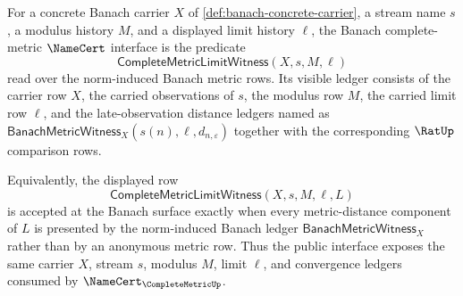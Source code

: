 \begin{definition}
\label{def:banach-complete-metric-namecert-interface}
For a concrete Banach carrier $X$ of
\autoref{def:banach-concrete-carrier}, a stream name $s$, a modulus history
$M$, and a displayed limit history $\ell$, the Banach complete-metric
$\NameCert$ interface is the predicate
$$
\mathsf{CompleteMetricLimitWitness}(X,s,M,\ell)
$$
read over the norm-induced Banach metric rows. Its visible ledger consists of
the carrier row $X$, the carried observations of $s$, the modulus row $M$, the
carried limit row $\ell$, and the late-observation distance ledgers named as
$\mathsf{BanachMetricWitness}_X(s(n),\ell,d_{n,\varepsilon})$ together with the
corresponding $\RatUp$ comparison rows.

Equivalently, the displayed row
$$
\mathsf{CompleteMetricLimitWitness}(X,s,M,\ell,L)
$$
is accepted at the Banach surface exactly when every metric-distance component
of $L$ is presented by the norm-induced Banach ledger
$\mathsf{BanachMetricWitness}_X$ rather than by an anonymous metric row. Thus
the public interface exposes the same carrier $X$, stream $s$, modulus $M$,
limit $\ell$, and convergence ledgers consumed by $\NameCert_{\CompleteMetricUp}$.
\end{definition}

